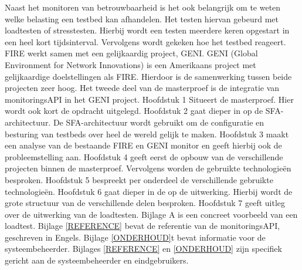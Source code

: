 \npar
Naast het monitoren van betrouwbaarheid is het ook belangrijk om te weten welke belasting een testbed kan afhandelen. Het testen hiervan gebeurd met loadtesten of stresstesten. Hierbij wordt een testen meerdere keren opgestart in een heel kort tijdsinterval. Vervolgens wordt gekeken hoe het testbed reageert.
\npar
FIRE werkt samen met een gelijkaardig project, GENI. GENI (Global Environment for Network Innovations) is een Amerikaans project met gelijkaardige doelstellingen als FIRE. Hierdoor is de samenwerking tussen beide projecten zeer hoog. Het tweede deel van de masterproef is de integratie van monitoringsAPI in het GENI project.
\npar
Hoofdstuk 1 Situeert de masterproef. Hier wordt ook kort de opdracht uitgelegd.
\npar
Hoofdstuk 2 gaat dieper in op de SFA-architectuur. De SFA-architectuur wordt gebruikt om de configuratie en besturing van testbeds over heel de wereld gelijk te maken.
\npar
Hoofdstuk 3 maakt een analyse van de bestaande FIRE en GENI monitor en geeft hierbij ook de probleemstelling aan.
\npar
Hoofdstuk 4 geeft eerst de opbouw van de verschillende projecten binnen de masterproef. Vervolgens worden de gebruikte technologie\"en besproken.
\npar
Hoofdstuk 5 bespreekt per onderdeel de verschillende gebruikte technologie\"en.
\npar
Hoofdstuk 6 gaat dieper in de op de uitwerking. Hierbij wordt de grote structuur van de verschillende delen besproken.
\npar
Hoofdstuk 7 geeft uitleg over de uitwerking van de loadtesten.
\npar
Bijlage A is een concreet voorbeeld van een loadtest.
\npar
Bijlage \ref{REFERENCE} bevat de referentie van de monitoringsAPI, geschreven in Engels.
\npar
Bijlage \ref{ONDERHOUD}t  bevat informatie voor de systeembeheerder.
\npar 
Bijlages \ref{REFERENCE} en \ref{ONDERHOUD} zijn specifiek gericht aan de systeembeheerder en eindgebruikers.